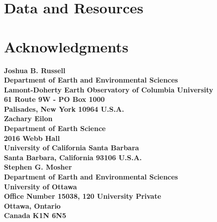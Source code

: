 \documentclass[12pt,titlepage]{article}
\begin{document}
\section{Data and Resources }


\section{Acknowledgments }


\newpage
{\bfseries\sffamily 
\noindent Joshua B. Russell \\
Department of Earth and Environmental Sciences \\
Lamont-Doherty Earth Observatory of Columbia University \\
61 Route 9W - PO Box 1000 \\
Palisades, New York 10964 U.S.A. \\

\noindent Zachary Eilon \\
Department of Earth Science \\
2016 Webb Hall \\
University of California Santa Barbara \\
Santa Barbara, California 93106 U.S.A. \\

\noindent Stephen G. Mosher \\
Department of Earth and Environmental Sciences \\
University of Ottawa \\
Office Number 15038, 120 University Private \\
Ottawa, Ontario \\
Canada K1N 6N5
}
\newpage
%
%



\newpage

\newpage

\end{document}
